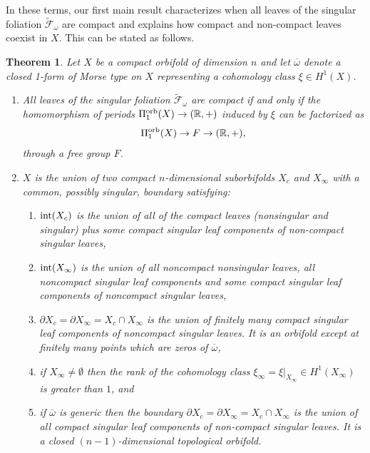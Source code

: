\documentclass[
  a4paper, 
  reqno, 
  oneside, 
  12pt
]{amsart}
\newtheorem{theorem}{Theorem}[section]
\theoremstyle{definition}
\theoremstyle{remark}
\begin{document}
In these terms, our first main result characterizes when all leaves of the singular foliation $\tilde{\mathcal{F}}_\omega$ are compact and explains how compact and non-compact leaves coexist in $X$. This can be stated as follows.

\begin{theorem}\label{thm1}
Let $X$ be a compact orbifold of dimension $n$ and let $\overline{\omega}$ denote a closed 1-form of Morse type on $X$ representing a cohomology class $\xi\in H^1(X)$.
\begin{enumerate}
\item All leaves of the singular foliation $\tilde{\mathcal{F}}_\omega$ are
compact if and only if the homomorphism of periods $\Pi_1^{\textnormal{orb}}(X)\to (\mathbb{R},+)$ induced by $\xi$ can be factorized 
as 
$$\Pi_1^{\textnormal{orb}}(X)\to F\to (\mathbb{R},+),$$
through a free group $F$. 
\item $X$ is the union of two compact $n$-dimensional suborbifolds $X_c$ and $X_\infty$ with a common, possibly singular, boundary satisfying:
\begin{enumerate}
	\item $\textnormal{int}(X_c)$ is the union of all of the compact leaves (nonsingular and singular) plus some compact singular leaf components of non-compact singular leaves,
	\item $\textnormal{int}(X_\infty)$ is the union of all noncompact nonsingular leaves, all noncompact singular leaf components and some compact singular leaf components of noncompact singular leaves,
	\item $\partial  X_c=\partial X_\infty=X_c\cap X_\infty$ is the union of finitely many compact singular leaf components of noncompact singular leaves. It is an orbifold except at finitely many points which are zeros of $\overline{\omega}$,
	\item if $X_\infty\neq \emptyset$ then the rank of the cohomology class $\xi_\infty=\xi|_{X_\infty}\in H^1(X_\infty)$ is greater than $1$, and
	\item if $\overline{\omega}$ is generic then the boundary $\partial  X_c=\partial X_\infty=X_c\cap X_\infty$ is the union of all compact singular leaf components of non-compact singular leaves. It is a closed $(n-1)$-dimensional topological orbifold.
\end{enumerate}
\end{enumerate}
\end{theorem}
\end{document}
